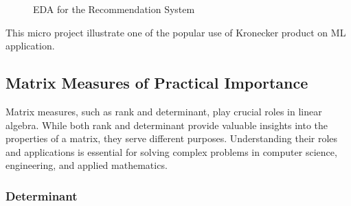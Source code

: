 \documentclass[
  letterpaper,
  DIV=11,
  numbers=noendperiod]{scrreprt}
\theoremstyle{plain}
\theoremstyle{definition}
\theoremstyle{remark}
\begin{document}
\begin{figure}[H]


\caption{\label{fig-reco}EDA for the Recommendation System}

\end{figure}%

This micro project illustrate one of the popular use of Kronecker
product on ML application.

\subsection{Matrix Measures of Practical
Importance}\label{matrix-measures-of-practical-importance}

Matrix measures, such as rank and determinant, play crucial roles in
linear algebra. While both rank and determinant provide valuable
insights into the properties of a matrix, they serve different purposes.
Understanding their roles and applications is essential for solving
complex problems in computer science, engineering, and applied
mathematics.

\subsubsection{Determinant}\label{determinant-1}
\end{document}
